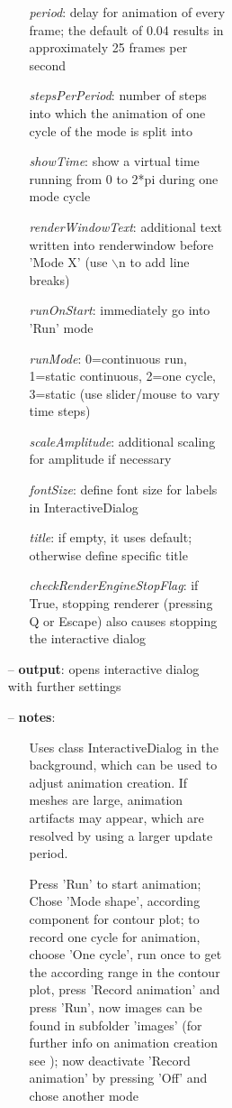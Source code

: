 \begin{itemize}[leftmargin=1.4cm]
\begin{itemize}[leftmargin=1.4cm]
\begin{itemize}[leftmargin=0.5cm]
\begin{itemize}[leftmargin=1.4cm]
\begin{itemize}[leftmargin=1.4cm]
\begin{itemize}[leftmargin=0.5cm]
\begin{itemize}[leftmargin=1.4cm]
\begin{itemize}[leftmargin=0.5cm]
\begin{itemize}[leftmargin=1.4cm]
\begin{itemize}[leftmargin=1.4cm]
\begin{itemize}[leftmargin=0.7cm]
\begin{itemize}[leftmargin=1.2cm]
    \item[] {\it     period}: delay for animation of every frame; the default of 0.04 results in approximately 25 frames per second
    \item[] {\it     stepsPerPeriod}: number of steps into which the animation of one cycle of the mode is split into
    \item[] {\it     showTime}: show a virtual time running from 0 to 2*pi during one mode cycle
    \item[] {\it     renderWindowText}: additional text written into renderwindow before 'Mode X' (use $\backslash$n to add line breaks)
    \item[] {\it     runOnStart}: immediately go into 'Run' mode
    \item[] {\it     runMode}: 0=continuous run, 1=static continuous, 2=one cycle, 3=static (use slider/mouse to vary time steps)
    \item[] {\it     scaleAmplitude}: additional scaling for amplitude if necessary
    \item[] {\it     fontSize}: define font size for labels in InteractiveDialog
    \item[] {\it     title}: if empty, it uses default; otherwise define specific title
    \item[] {\it     checkRenderEngineStopFlag}: if True, stopping renderer (pressing Q or Escape) also causes stopping the interactive dialog
  \end{itemize}
  \item[--]  {\bf output}: opens interactive dialog with further settings  \item[--]  {\bf notes}: \vspace{-6pt}
  \begin{itemize}[leftmargin=1.2cm]
\setlength{\itemindent}{-0.7cm}
    \item[] Uses class InteractiveDialog in the background, which can be used to adjust animation creation. If meshes are large, animation artifacts may appear, which are resolved by using a larger update period.
    \item[]     Press 'Run' to start animation; Chose 'Mode shape', according component for contour plot; to record one cycle for animation, choose 'One cycle', run once to get the according range in the contour plot, press 'Record animation' and press 'Run', now images can be found in subfolder 'images' (for further info on animation creation see ); now deactivate 'Record animation' by pressing 'Off' and chose another mode

\end{itemize}
\end{itemize}
\end{itemize}
\end{itemize}
\end{itemize}
\end{itemize}
\end{itemize}
\end{itemize}
\end{itemize}
\end{itemize}
\end{itemize}
\end{itemize}
